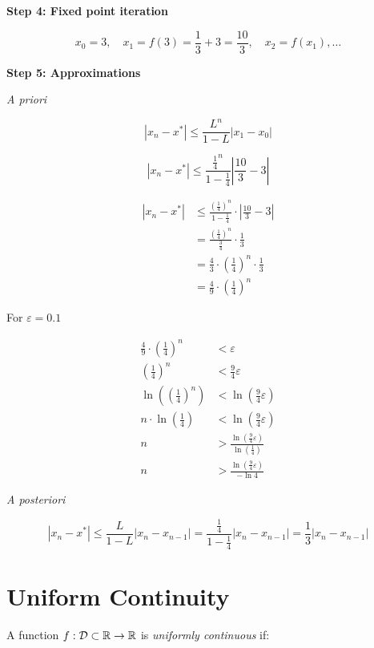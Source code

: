 \textbf{Step 4: Fixed point iteration}

\[
    x_0 = 3, \quad x_1 = f(3) = \frac{1}{3} + 3 = \frac{10}{3}, \quad x_2 = f(x_1), \dots
\]

\textbf{Step 5: Approximations}

\emph{A priori}

\[
    |x_n - x^*| \le \frac{L^n}{1 - L} |x_1 - x_0|
\]

\[
    |x_n - x^*| \le \frac{\frac{1}{4}^n}{1 - \frac{1}{4}} |\frac{10}{3}  - 3|
\]

\begin{align*}
    |x_n - x^*| &\le \frac{\left(\frac{1}{4}\right)^n}{1 - \frac{1}{4}} \cdot \left|\frac{10}{3} - 3\right| \\
    &= \frac{\left(\frac{1}{4}\right)^n}{\frac{3}{4}} \cdot \frac{1}{3}\\
    &= \frac{4}{3} \cdot \left(\frac{1}{4}\right)^n \cdot \frac{1}{3}\\
    &= \frac{4}{9} \cdot \left(\frac{1}{4}\right)^n
\end{align*}

For \(\varepsilon = 0.1\)

\begin{align*}
    \frac{4}{9} \cdot \left(\frac{1}{4}\right)^n &< \varepsilon \\
    \left(\frac{1}{4}\right)^n &< \frac{9}{4} \varepsilon \\
    \ln\left(\left(\frac{1}{4}\right)^n\right) &< \ln\left(\frac{9}{4} \varepsilon\right) \\
    n \cdot \ln\left(\frac{1}{4}\right) &< \ln\left(\frac{9}{4} \varepsilon\right) \\
    n &> \frac{\ln\left(\frac{9}{4} \varepsilon\right)}{\ln\left(\frac{1}{4}\right)} \\
    n &> \frac{\ln\left(\frac{9}{4} \varepsilon\right)}{-\ln 4}
\end{align*}


\emph{A posteriori}

\[
    |x_n - x^*| \le \frac{L}{1 - L} |x_n - x_{n-1}| = \frac{\frac{1}{4}}{1 - \frac{1}{4}} |x_n - x_{n-1}| = \frac{1}{3} |x_n - x_{n-1}|
\]

\section{Uniform Continuity}

A function \(f: \mathcal{D} \subset \mathbb{R} \to \mathbb{R}\) is \emph{uniformly continuous} if:

